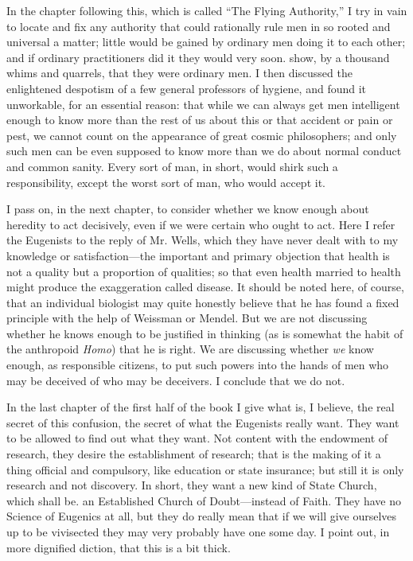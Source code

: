\documentclass{book}
\begin{document}
In the chapter following this, which is called “The Flying Authority,” I try in vain to locate and fix any authority that could rationally rule men in so rooted and universal a matter; little would be gained by ordinary men doing it to each other; and if ordinary practitioners did it they would very soon. show, by a thousand whims and quarrels, that they were ordinary men. I then discussed the enlightened despotism of a few general professors of hygiene, and found it unworkable, for an essential reason: that while we can always get men intelligent enough to know more than the rest of us about this or that accident or pain or pest, we cannot count on the appearance of great cosmic philosophers; and only such men can be even supposed to know more than we do about normal conduct and common sanity. Every sort of man, in short, would shirk such a responsibility, except the worst sort of man, who would accept it.

I pass on, in the next chapter, to consider whether we know enough about heredity to act decisively, even if we were certain who ought to act. Here I refer the Eugenists to the reply of Mr. Wells, which they have never dealt with to my knowledge or satisfaction—the important and primary objection that health is not a quality but a proportion of qualities; so that even health married to health might produce the exaggeration called disease. It should be noted here, of course, that an individual biologist may quite honestly believe that he has found a fixed principle with the help of Weissman or Mendel. But we are not discussing whether he knows enough to be justified in thinking (as is somewhat the habit of the anthropoid \emph{Homo}) that he is right. We are discussing whether \emph{we} know enough, as responsible citizens, to put such powers into the hands of men who may be deceived of who may be deceivers. I conclude that we do not.

In the last chapter of the first half of the book I give what is, I believe, the real secret of this confusion, the secret of what the Eugenists really want. They want to be allowed to find out what they want. Not content with the endowment of research, they desire the establishment of research; that is the making of it a thing official and compulsory, like education or state insurance; but still it is only research and not discovery. In short, they want a new kind of State Church, which shall be. an Established Church of Doubt—instead of Faith. They have no Science of Eugenics at all, but they do really mean that if we will give ourselves up to be vivisected they may very probably have one some day. I point out, in more dignified diction, that this is a bit thick.
\end{document}
